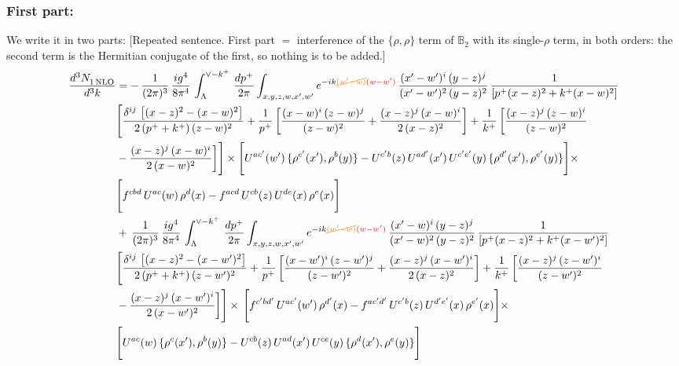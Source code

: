 \documentclass[9pt]{article}
\def\mf#1{\mathbb{#1}}
\numberwithin{equation}{section}
\begin{document}
\subsubsection{First part:\,}
{\color{orange}We write it in two parts:} {\color{red}[Repeated sentence. First part $=$ interference of the $\{\rho,\rho\}$ term of $\mf{B}_2$ with its single-$\rho$ term, in both orders: the second term is the Hermitian conjugate of the first, so nothing is to be added.]}
\begin{align}
    \frac{d^{3}N_{1\,\rm NLO}^{\rm}}{d^{3}k}  & = -\,\frac{1}{(2\pi)^{3}}\, \frac{ig^{4}}{8\pi^{4}}\, \int_{\Lambda}^{\vee-k^{+}}\, \frac{dp^{+}}{2\pi}\int_{x,y,z,w,x',w^{\prime}} e^{-ik{\color{orange}\cancel{(w^{\prime}-w)}}{\color{red}(w-w^{\prime})}}\, \frac{(x'-w')^{i}\,(y-z)^{j}}{(x'-w')^{2}\,(y-z)^{2}}\,\frac{1}{\left[p^{+}(x-z)^{2}+k^{+}(x-w)^{2}\right]} \notag \\ & \Bigg[\frac{\delta^{ij}\, \left[(x-z)^{2}-(x-w)^{2}\right]}{2\, (p^{+}+k^{+})\,(z-w)^{2}}+\frac{1}{p^{+}}\, \bigg[\frac{(x-w)^{i}\,(z-w)^{j}}{(z-w)^{2}}+\frac{(x-z)^{j}\,(x-w)^{i}}{2\,(x-z)^{2}}\bigg]+\frac{1}{k^{+}}\,\bigg[\frac{(x-z)^{j}\,(z-w)^{i}}{(z-w)^{2}}\notag \\ & -\frac{(x-z)^{j}\,(x-w)^{i}}{2\,(x-w)^{2}}\bigg]\Bigg]\times \Bigg[U^{ac'}(w')\,\{\rho^{c'}(x'),\rho^{b}(y)\}-U^{c'b}(z)\,U^{ad'}(x')\,U^{c'e'}(y)\, \{\rho^{d'}(x'),\rho^{e'}(y)\}\Bigg]\times \notag \\ & \Bigg[f^{cbd}\,U^{ac}(w)\,\rho^{d}(x)-f^{acd}\, U^{cb}(z)\,U^{de}(x)\,\rho^{e}(x)\Bigg]\notag \\ & +\,\frac{1}{(2\pi)^{3}}\, \frac{ig^{4}}{8\pi^{4}}\, \int_{\Lambda}^{\vee-k^{+}}\,\frac{dp^{+}}{2\pi}\int_{x,y,z,w,x',w^{\prime}} e^{-ik{\color{orange}\cancel{(w^{\prime}-w)}}{\color{red}(w-w^{\prime})}}\, \frac{(x'-w)^{i}\,(y-z)^{j}}{(x'-w)^{2}\,(y-z)^{2}}\,\frac{1}{\left[p^{+}(x-z)^{2}+k^{+}(x-w')^{2}\right]} \notag \\ & \Bigg[\frac{\delta^{ij}\, \left[(x-z)^{2}-(x-w')^{2}\right]}{2\, (p^{+}+k^{+})\,(z-w')^{2}}+\frac{1}{p^{+}}\, \bigg[\frac{(x-w')^{i}\,(z-w')^{j}}{(z-w')^{2}}+\frac{(x-z)^{j}\,(x-w')^{i}}{2\,(x-z)^{2}}\bigg]+\frac{1}{k^{+}}\,\bigg[\frac{(x-z)^{j}\,(z-w')^{i}}{(z-w')^{2}}\notag \\ & -\frac{(x-z)^{j}\,(x-w')^{i}}{2\,(x-w')^{2}}\bigg]\Bigg]\times\,\Bigg[f^{c'bd'}\,U^{ac'}(w')\,\rho^{d'}(x)-f^{ac'd'}\, U^{c'b}(z)\,U^{d'e'}(x)\,\rho^{e'}(x)\Bigg] \times \notag \\ & \Bigg[U^{ac}(w)\,\{\rho^{c}(x'),\rho^{b}(y)\}-U^{cb}(z)\,U^{ad}(x')\,U^{ce}(y)\, \{\rho^{d}(x'),\rho^{e}(y)\}\Bigg]
\end{align}
\end{document}
